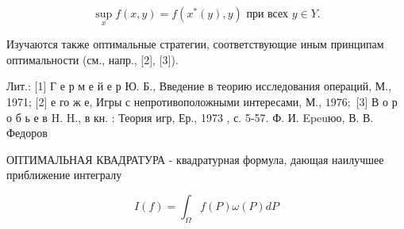 \documentclass[10pt]{article}
\begin{document}
\[

\sup _{x} f(x, y)=f\left(x^{*}(y), y\right) \text { при всех } y \in Y .

\]



Изучаются также оптимальные стратегии, соответствующие иным принципам оптимальности (см., напр., [2], [3]).



Лит.: [1] Г е р м е й е р Ю. Б., Введение в теорию исследования операций, М., 1971; [2] е го ж е, Игры с непротивоположными интересами, М., $1976 ;$ [3] В о р о б ь е в H. H., в кн. : Теория игр, Ер., 1973 , с. 5-57. Ф. И. Epeuюо, В. В. Федоров



ОПТИМАЛЬНАЯ КВАДРАТУРА - квадратурная формула, дающая наилучшее приближение интегралу



\[

I(f)=\int_{\Omega} f(P) \omega(P) d P

\]
\end{document}
